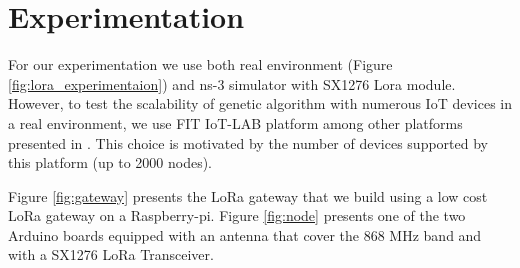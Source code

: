 \section{Experimentation} \label{sec:Experimentation}

For our experimentation we use both real environment (Figure \ref{fig:lora_experimentaion}) and ns-3 simulator with SX1276 Lora module.
However,
	to test the scalability of genetic algorithm with numerous IoT devices in a real environment,
	we use FIT IoT-LAB platform among other platforms presented in \cite{tonneau_how_2015}.
This choice is motivated by the number of devices supported by this platform (up to 2000 nodes).

Figure \ref{fig:gateway} presents the LoRa gateway that we build using a low cost LoRa gateway \cite{lowcostloragateway} on a Raspberry-pi.
Figure \ref{fig:node}  presents one of the two Arduino boards equipped with an antenna that cover the 868 MHz band and with a SX1276 LoRa Transceiver.



